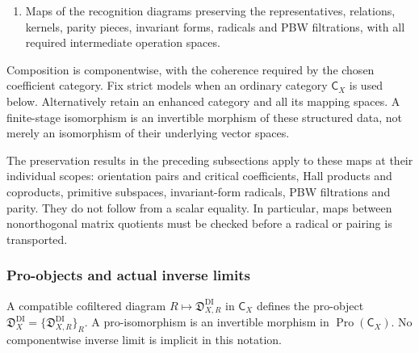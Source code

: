 \begin{definition}
\begin{enumerate}
  \(\Theta_{\mathrm{Kos}}\).
\item[(M8)] Maps of the recognition diagrams preserving the
  representatives, relations, kernels, parity pieces, invariant
  forms, radicals and PBW filtrations, with all required
  intermediate operation spaces.
\end{enumerate}
Composition is componentwise, with the coherence required by the
chosen coefficient category. Fix strict models when an ordinary
category \(\mathsf C_X\) is used below. Alternatively retain an
enhanced category and all its mapping spaces. A finite-stage
isomorphism is an invertible morphism of these structured data,
not merely an isomorphism of their underlying vector spaces.
\end{definition}

The preservation results in the preceding subsections apply to
these maps at their individual scopes: orientation pairs and
critical coefficients, Hall products and coproducts, primitive
subspaces, invariant-form radicals, PBW filtrations and parity.
They do not follow from a scalar equality. In particular, maps
between nonorthogonal matrix quotients must be checked before a
radical or pairing is transported.

\subsubsection*{Pro-objects and actual inverse limits}

\begin{definition}
\label{def:dirac-igusa-pro-isomorphism}
A compatible cofiltered diagram
\(R\mapsto\mathfrak D^{\mathrm{DI}}_{X,R}\) in \(\mathsf C_X\)
defines the pro-object
\(\mathfrak D_X^{\mathrm{DI}}=\{\mathfrak D^{\mathrm{DI}}_{X,R}\}_R\).
A pro-isomorphism is an invertible morphism in
\(\operatorname{Pro}(\mathsf C_X)\).
No componentwise inverse limit is implicit in this notation.
\end{definition}

